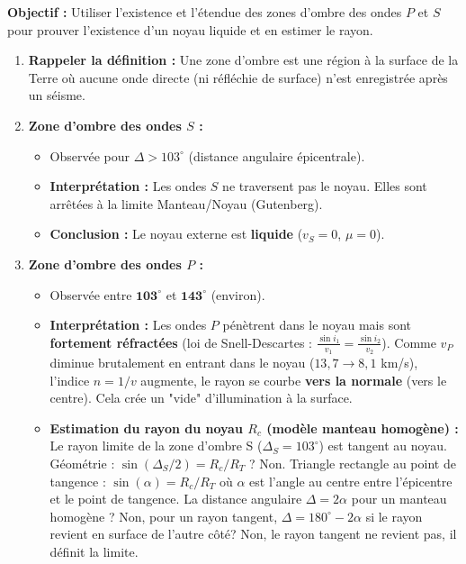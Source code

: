 \documentclass[11pt]{article}
\newcommand{\cle}[1]{{\popxbold\color{popdark}#1}}
\begin{document}
\begin{methode}
\textbf{Objectif :} Utiliser l'existence et l'étendue des zones d'ombre des ondes $P$ et $S$ pour prouver l'existence d'un noyau liquide et en estimer le rayon.
\begin{enumerate}
    \item \textbf{Rappeler la définition :} Une \cle{zone d'ombre} est une région à la surface de la Terre où aucune onde directe (ni réfléchie de surface) n'est enregistrée après un séisme.
    \item \textbf{Zone d'ombre des ondes $S$ :}
    \begin{itemize}
        \item Observée pour $\Delta > 103^\circ$ (distance angulaire épicentrale).
        \item \textbf{Interprétation :} Les ondes $S$ ne traversent pas le noyau. Elles sont arrêtées à la limite Manteau/Noyau (Gutenberg).
        \item \textbf{Conclusion :} Le noyau externe est \textbf{liquide} ($v_S = 0$, $\mu = 0$).
    \end{itemize}
    \item \textbf{Zone d'ombre des ondes $P$ :}
    \begin{itemize}
        \item Observée entre $\mathbf{103^\circ}$ et $\mathbf{143^\circ}$ (environ).
        \item \textbf{Interprétation :} Les ondes $P$ pénètrent dans le noyau mais sont \textbf{fortement réfractées} (loi de Snell-Descartes : $\frac{\sin i_1}{v_1} = \frac{\sin i_2}{v_2}$). Comme $v_P$ diminue brutalement en entrant dans le noyau ($13,7 \rightarrow 8,1$ km/s), l'indice $n=1/v$ augmente, le rayon se courbe \textbf{vers la normale} (vers le centre). Cela crée un "vide" d'illumination à la surface.
        \item \textbf{Estimation du rayon du noyau $R_c$ (modèle manteau homogène) :}
        Le rayon limite de la zone d'ombre S ($\Delta_S = 103^\circ$) est tangent au noyau.
        Géométrie : $\sin(\Delta_S/2) = R_c / R_T$ ? Non.
        Triangle rectangle au point de tangence : $\sin(\alpha) = R_c/R_T$ où $\alpha$ est l'angle au centre entre l'épicentre et le point de tangence. La distance angulaire $\Delta = 2\alpha$ pour un manteau homogène ? Non, pour un rayon tangent, $\Delta = 180^\circ - 2\alpha$ si le rayon revient en surface de l'autre côté? Non, le rayon tangent ne revient pas, il définit la limite.

\end{itemize}
\end{enumerate}
\end{methode}
\end{document}
